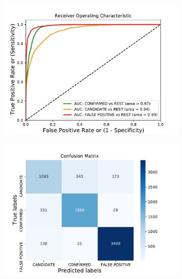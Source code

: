 \begin{figure}[H]
                \centering
                \begin{subfigure}{.49\textwidth}
                \includegraphics[width = 1\textwidth]{data/DT_vif_overfit_roc.pdf}
                \end{subfigure}
                \begin{subfigure}{.49\textwidth}
                \includegraphics[width = 1\textwidth]{data/DT_vif_overfit_cm.pdf}
                \end{subfigure}
                \begin{subfigure}{.49\textwidth}

\end{subfigure}
\end{figure}
